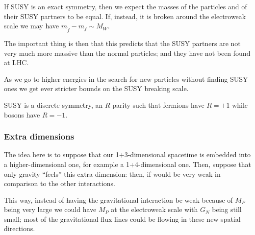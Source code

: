 \documentclass[main.tex]{subfiles}
\begin{document}
If SUSY is an exact symmetry, then we expect the masses of the particles and of their SUSY partners to be equal. 
If, instead, it is broken around the electroweak scale we may have \(m_{\widetilde{f}}  - m_f \sim M_W\).

The important thing is then that this predicts that the SUSY partners are not very much more massive than the normal particles; and they have not been found at LHC. 

As we go to higher energies in the search for new particles without finding SUSY ones we get ever stricter bounds on the SUSY breaking scale.

SUSY is a discrete symmetry, an \(R\)-parity such that fermions have \(R = +1\) while bosons have \(R = -1\). 

\subsubsection{Extra dimensions}

The idea here is to suppose that our 1+3-dimensional spacetime is embedded into a higher-dimensional one, for example a 1+4-dimensional one. 
Then, suppose that only gravity ``feels'' this extra dimension: then, if would be very weak in comparison to the other interactions. 


This way, instead of having the gravitational interaction be weak because of \(M_P\) being very large we could have \(M_P\) at the electroweak scale with \(G_N\) being still small; most of the gravitational flux lines could be flowing in these new spatial directions.  
\end{document}
